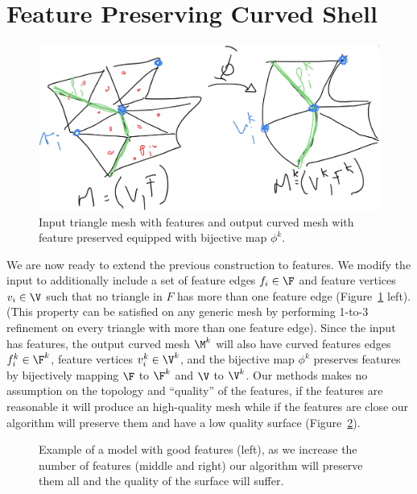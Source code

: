 \section{Feature Preserving Curved Shell}


\begin{figure}
    \centering
    \includegraphics[width=.7\linewidth]{curve_meshing_in_shell_tex/figs/input-output}
    \caption{Input triangle mesh with features and output curved mesh with feature preserved equipped with bijective map $\phi^k$.}
    \label{bichon:fig:input-output-feature}
\end{figure}

We are now ready to extend the previous construction to features. We modify the input to additionally include a set of feature edges $f_i\in\F$ and feature vertices $v_i\in\V$ such that no triangle in $F$ has more than one feature edge (Figure~\ref{bichon:fig:input-output-feature} left). (This property can be satisfied on any generic mesh by performing 1-to-3 refinement on every triangle with more than one feature edge). Since the input has features, the output curved mesh $\M^k$ will also have curved features edges $f_i^k\in\F^k$, feature vertices $v_i^k\in\V^k$, and the bijective map $\phi^k$ preserves features by bijectively mapping $\F$ to $\F^k$ and $\V$ to $\V^k$. Our methods makes no assumption on the topology and ``quality'' of the features, if the features are reasonable it will produce an high-quality mesh while if the features are close our algorithm will preserve them and have a low quality surface (Figure~\ref{bichon:fig:bad-features}).

\begin{figure}
    \centering
    \caption{Example of a model with good features (left), as we increase the number of features (middle and right) our algorithm will preserve them all and the quality of the surface will suffer.}
    \label{bichon:fig:bad-features}
\end{figure}



